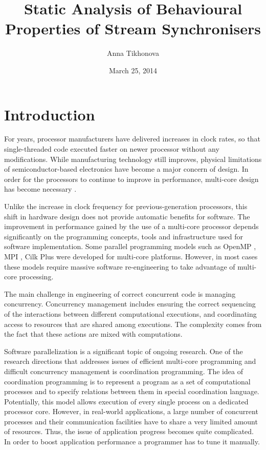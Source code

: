 \documentclass{article}
\begin{document}
\author{Anna Tikhonova}
\title{Static Analysis of Behavioural Properties of Stream Synchronisers}
\date{March 25, 2014}
\maketitle
\tableofcontents

\section{Introduction}
For years, processor manufacturers have delivered increases in clock rates, so that single-threaded code executed faster on newer processor without any modifications. While manufacturing technology still improves, physical limitations of semiconductor-based electronics have become a major concern of design. In order for the processors to continue to improve in performance, multi-core design has become necessary \cite{sutter}.

Unlike the increase in clock frequency for previous-generation processors, this shift in hardware design does not provide automatic benefits for software. The improvement in performance gained by the use of a multi-core processor depends significantly on the programming concepts, tools and infrastructure used for software implementation. Some parallel programming models such as OpenMP \cite{openmp}, MPI \cite{mpi}, Cilk Plus \cite{cilk} were developed for multi-core platforms. However, in most cases these models require massive software re-engineering to take advantage of multi-core processing.

The main challenge in engineering of correct concurrent code is managing concurrency. Concurrency management includes ensuring the correct sequencing of the interactions between different computational executions, and coordinating access to resources that are shared among executions. The complexity comes from the fact that these actions are mixed with computations.

Software parallelization is a significant topic of ongoing research. One of the research directions that addresses issues of efficient multi-core programming and difficult concurrency management is coordination programming. The idea of coordination programming is to represent a program as a set of computational processes and to specify relations between them in special coordination language. Potentially, this model allows execution of every single process on a dedicated processor core. However, in real-world applications, a large number of concurrent processes and their communication facilities have to share a very limited amount of resources. Thus, the issue of application progress becomes quite complicated. In order to boost application performance a programmer has to tune it manually.
\end{document}
